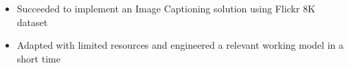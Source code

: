 \divider
\divider


\begin{itemize}
\item Succeeded to implement an Image Captioning solution using Flickr 8K dataset
\item Adapted with limited resources and engineered a relevant working model in a short time
\end{itemize}



\divider


